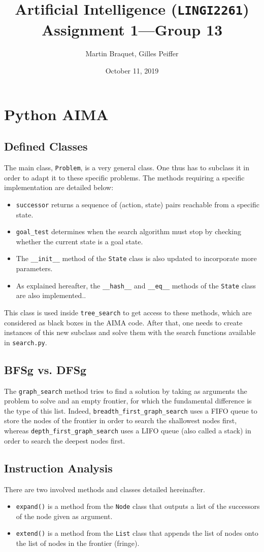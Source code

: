 \documentclass[journal]{IEEEtran}
\title{Artificial Intelligence (\texttt{LINGI2261}) \\ Assignment 1---Group 13}
\author{Martin Braquet, Gilles Peiffer}
\date{October 11, 2019}
\newcommand{\py}[1]{\texttt{#1}}
\begin{document}
\maketitle

\section{Python AIMA}
\subsection{Defined Classes}
The main class, \py{Problem}, is a very general class. One thus has to subclass it in order to adapt it to these specific problems.
 The methods requiring a specific implementation are detailed below:
 \begin{itemize}
  \item \py{successor} returns a sequence of (action, state) pairs reachable from a specific state.
  \item \py{goal_test} determines when the search algorithm must stop by checking whether the current state is a goal state.
  \item The \py{__init__} method of the \py{State} class is also updated to incorporate more parameters.
  \item As explained hereafter, the \py{__hash__} and \py{__eq__} methods of the \py{State} class are also implemented..
 \end{itemize}
This class is used inside \py{tree_search} to get access to these methods, which are considered as black boxes in the AIMA code.
 After that, one needs to create instances of this new subclass and solve them with the search functions available in \py{search.py}.
 \subsection{BFSg vs. DFSg}
 The \py{graph_search} method tries to find a solution by taking as arguments the problem to solve and an empty frontier, for which the fundamental difference is the type of this list.
 Indeed, \py{breadth_first_graph_search} uses a FIFO queue to store the nodes of the frontier in order to search the shallowest nodes first, whereas \py{depth_first_graph_search} uses a LIFO queue  (also called a stack) in order to search the deepest nodes first.
 \subsection{Instruction Analysis}
 There are two involved methods and classes detailed hereinafter.
 \begin{itemize}
 	\item \py{expand()} is a method from the \py{Node} class that outputs a list of the successors of the node given as argument.
 	\item \py{extend()} is a method from the \py{List} class that appends the list of nodes onto the list of nodes in the frontier (fringe).
 \end{itemize}
\end{document}
